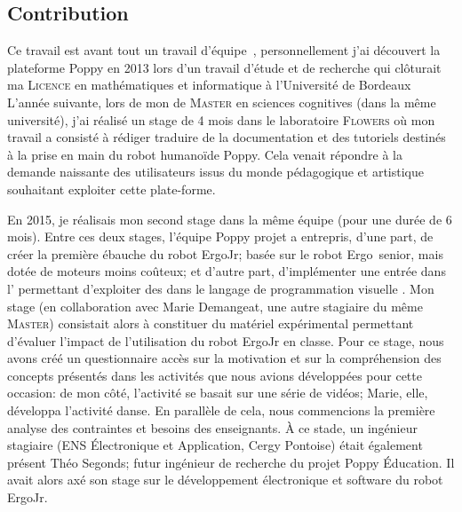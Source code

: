 \subsection*{Contribution}
        Ce travail est avant tout un travail d'équipe~, personnellement j'ai découvert la plateforme Poppy en 2013 lors d'un travail d'étude et de recherche qui clôturait ma \textsc{Licence} en mathématiques et informatique à l'Université de Bordeaux
        L'année suivante, lors de mon de \textsc{Master} en sciences cognitives (dans la même université), j'ai réalisé un stage de 4 mois dans le laboratoire \textsc{Flowers} où mon travail a consisté à rédiger \etou traduire de la documentation et des tutoriels destinés à la prise en main du robot humanoïde Poppy.
        Cela venait répondre à la demande naissante des utilisateurs issus du monde pédagogique et artistique souhaitant exploiter cette plate-forme.\par%
        En 2015, je réalisais mon second stage dans la même équipe (pour une durée de 6 mois). Entre ces deux stages, l'équipe Poppy projet  a entrepris, d'une part, de créer la première ébauche du robot ErgoJr; basée sur le robot Ergo~senior, mais dotée de moteurs moins coûteux; et d'autre part, d'implémenter  une entrée dans l' permettant d'exploiter des  dans le langage de programmation visuelle .
        Mon stage (en collaboration avec Marie Demangeat, une autre stagiaire du même \textsc{Master}) consistait alors à constituer du matériel expérimental permettant d'évaluer l'impact de l'utilisation du robot ErgoJr en classe.
        Pour ce stage, nous avons créé un questionnaire accès sur la motivation et sur la compréhension des concepts présentés dans les activités que nous avions développées pour cette occasion:
        de mon côté, l'activité se basait sur une série de vidéos; Marie, elle, développa l'activité danse.
        En parallèle de cela, nous commencions la première analyse des contraintes et besoins des enseignants.
        À ce stade, un ingénieur stagiaire (ENS Électronique et Application, Cergy Pontoise) était également présent Théo Segonds; futur ingénieur de recherche du projet Poppy Éducation. Il avait alors axé son stage sur le développement électronique et software du robot ErgoJr.\par%
